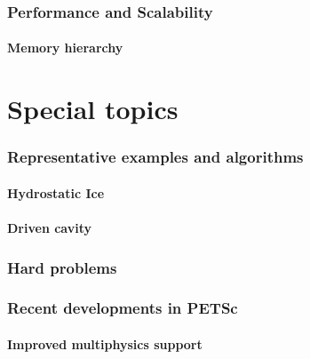 \documentclass{beamer}
\begin{document}
\section{Performance and Scalability}



\subsection{Memory hierarchy}










%


\part{Special topics}
\section{Representative examples and algorithms}
\subsection{Hydrostatic Ice}

\subsection{Driven cavity}



\section{Hard problems}


%


\section{Recent developments in PETSc}
\subsection{Improved multiphysics support}







\end{document}

